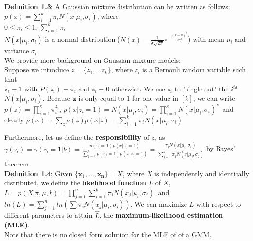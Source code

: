 \documentclass{article}
\begin{document}
\textbf{Definition 1.3}: A Gaussian mixture distribution can be written as follows:\\ \(p(x) = \sum_{i=1}^{k} \pi_i N(x | \mu_i, \sigma_i)\), where \\

\(0 \leq \pi_i \leq 1\), \(\sum_{i=1}^k \pi_i\)\\
\(N(x | \mu_i, \sigma_i)\) is a normal distribution (\(N(x) = \frac{1}{\sigma \sqrt{2\pi}} e^{ - \frac{(x - \mu)^2}{2\sigma^2}}\)) with mean \(u_i\) and variance \(\sigma_i\)\\

We provide more background on Gaussian mixture models:\\

Suppose we introduce \(z = \{z_1, ... z_k\} \), where \(z_i\) is a Bernouli random variable such that\\ \(z_i = 1\) with \(P(z_i) = \pi_i\) and \(z_i = 0\) otherwise. We use \(z_i\) to "single out" the \(i^{th}\) \(N(x | \mu_i, \sigma_i)\). Because \(\bm{z}\) is only equal to \(1\) for one value in \([k]\), we can write \(p(z) = \prod_{i=1}^k \pi_i^{z_i}\),
\(p(x | z_i = 1 ) = N(x | \mu_i, \sigma_i) = \prod_{i=1}^k N(x | \mu_i, \sigma_i)^{z_i}\)
and clearly \(p(x) = \sum_z p(z) p(x | z) = \sum_{i=1}^k \pi_i N(x | \mu_i, \sigma_i)\)

Furthermore, let us define the \textbf{responsibility} of \(z_i\) as \(\gamma(z_i) = \gamma(z_i = 1 | k) = \frac{p(z_i = 1)p(x| z_i = 1)}{ \sum_{j=1}^k p(z_j = 1) p(x | z_j = 1) } = \frac{\pi_i N(x | \mu_i, \sigma_i)}{\sum_{j=1}^k \pi_j N(x | \mu_j, \sigma_j)}\) by Bayes' theorem.\\

\textbf{Definition 1.4}: Given \(\{\bm{x_1}, \dots, \bm{x_n} \} = {X}\), where \({X}\) is independently and identically distributed, we define the \textbf{likelihood function} \(L\) of \({X}\), \(L = p( X | \pi, \mu, k) = \prod_{j=1}^n \sum_{i=1}^k \pi_i N(x_j | \mu_i, \sigma_i)\), and \(ln(L) = \sum_{j=1}^n ln (\sum \pi_i N(x_j | \mu_i, \sigma_i) )\). We can maximize \(L\) with respect to different parameters to attain \(\hat{L}\), the \textbf{maximum-likelihood estimation (MLE)}. \\Note that there is no closed form solution for the MLE of of a  GMM.
\end{document}
